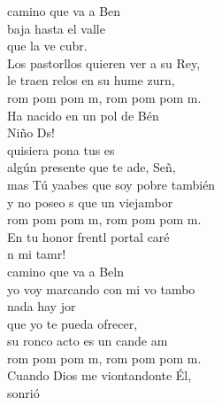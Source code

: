 \documentclass[12pt]{article}
\begin{document}
\begin{multicols*}{2}
\begin{cancion}[El tamborilero][]%
	 camino que va a Ben \\
baja hasta el valle \\
	que la ve cubr. \\
	Los pastorllos quieren ver a su Rey,\\
	le traen relos en su hume zurn,\\
	rom pom pom m, rom pom pom m.\\
	Ha nacido en un pol de Bén\\
	 Niño Ds!\\
\jump
	 quisiera pona tus es\\
	algún presente que te ade, Señ, \\
	mas Tú yaabes que soy pobre también\\
	y no poseo s que un viejambor\\
	rom pom pom m, rom pom pom m.\\
	En tu honor frentl portal caré\\
	n mi tamr!\\
\jump
	 camino que va a Beln\\
	yo voy marcando con mi vo tambo\\
	nada hay jor \\
que yo te pueda ofrecer,\\
	su ronco acto es un cande am\\
	rom pom pom m, rom pom pom m.\\
	Cuando Dios me viontandonte Él,\\
	 sonrió\\
\end{cancion}%


\end{multicols*}
\end{document}
